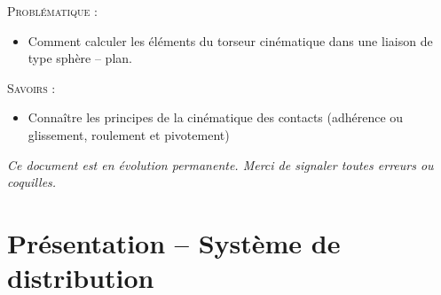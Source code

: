 \documentclass[10pt,oneside]{article}
\begin{document}
\begin{prob}
\textsc{Problématique :}
\begin{itemize}
\item Comment calculer les éléments du torseur cinématique dans une liaison de type sphère -- plan.
\end{itemize}
\end{prob}

\begin{savoir}
\textsc{Savoirs :}
\begin{itemize}
\item Connaître les principes de la cinématique des contacts (adhérence ou glissement, roulement et pivotement)
\end{itemize}
\end{savoir}

\setlength{\parskip}{0ex plus 0.2ex minus 0ex}
 \renewcommand{\contentsname}{}
 \renewcommand{\baselinestretch}{1}

\tableofcontents

 \renewcommand{\baselinestretch}{1.2}
\setlength{\parskip}{2ex plus 0.5ex minus 0.2ex}

\textit{Ce document est en évolution permanente. Merci de signaler toutes
erreurs ou coquilles.}


\section{Présentation -- Système de distribution}
\end{document}
